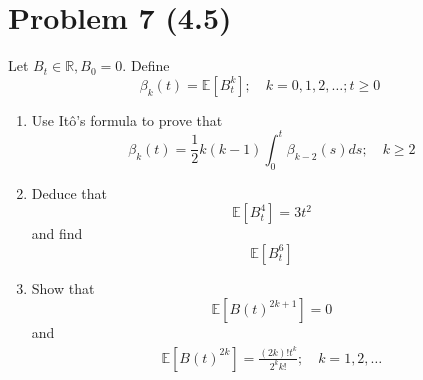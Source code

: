 \documentclass[11pt]{article}
\newcommand{\E}{\mathbb{E}}
\begin{document}
 \section*{Problem 7 (4.5)}
 Let $B _ { t } \in \mathbb { R } , B _ { 0 } = 0 .$ Define
$$\beta _ { k } ( t ) = \E \left[ B _ { t } ^ { k } \right] ; \quad k = 0,1,2 , \ldots ; t \geq 0$$
\begin{enumerate}
\item Use It\^o's formula to prove that
$$
 \beta _ { k } ( t ) = \frac { 1 } { 2 } k ( k - 1 ) \int _ { 0 } ^ { t } \beta _ { k - 2 } ( s ) d s ; \quad k \geq 2$$
\item Deduce that 
$$
\E \left[ B _ { t } ^ { 4 } \right] = 3 t ^ { 2 }
$$
and find 
$$
\E \left[ B _ { t } ^ { 6 } \right]
$$
\item Show that 
$$
\E \left[ B ( t ) ^ { 2 k + 1 } \right] = 0
$$
and 
\begin{align}\label{eq:ind}
\E \left[ B ( t ) ^ { 2 k } \right] = \frac { ( 2 k ) ! t ^ { k } } { 2 ^ { k } k ! } ; \quad k = 1,2 , \ldots
\end{align}
\end{enumerate} 
\end{document}
